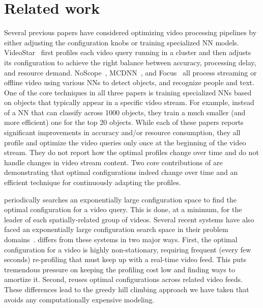 \section{Related work}
\label{sec:related}

Several previous papers have considered optimizing video processing pipelines by either adjusting the configuration knobs or training specialized NN models.
VideoStar~\cite{videostar} first profiles each video query running in a cluster and then adjusts its configuration to achieve the right balance between accuracy, processing delay, and resource demand.
NoScope~\cite{noscope}, MCDNN~\cite{mcdnn}, and Focus~\cite{focus} all process streaming or offline video using various NNs to detect objects, and recognize people and text.
One of the core techniques in all three papers is training specialized NNs based on objects that typically appear in a specific video stream. For example, instead of a NN that can classify across 1000 objects, they train a much smaller (and more efficient) one for the top 20 objects.
While each of these papers reports significant improvements in accuracy and/or resource consumption, they all profile and optimize the video queries only once at the beginning of the video stream. 
They do not report how the optimal profiles change over time and do not handle changes in video stream content.
Two core contributions of \name are demonstrating that optimal configurations indeed change over time and an efficient technique for continuously adapting the profiles.


\name periodically searches an exponentially large configuration space to find the optimal \nn configuration for a video query.  This is done, at a minimum, for the leader of each spatially-related group of videos. Several recent systems have also faced an exponentially large configuration search space in their problem domains~\cite{ernest,cherrypick,amazon-bandit}. \name differs from these systems in two major ways. First, the optimal configuration for a video is highly non-stationary, requiring frequent (every few seconds) re-profiling that must keep up with a real-time video feed. This puts tremendous pressure on keeping the profiling cost low and finding ways to amortize it. Second, \name reuses optimal configurations across related video feeds. These differences lead to the greedy hill climbing approach we have taken that avoids any computationally expensive modeling. 

